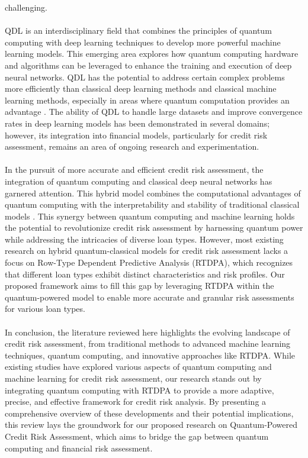 \documentclass[a4paper]{article}
\begin{document}
challenging.\\\\ QDL is an interdisciplinary field that combines the principles of quantum computing with deep learning techniques to develop more powerful machine learning models. This emerging area explores how quantum computing hardware and algorithms can be leveraged to enhance the training and execution of deep neural networks. QDL has the potential to address certain complex problems more efficiently than classical deep learning methods and classical machine learning methods, especially in areas where quantum computation provides an advantage \cite{9528698}. The ability of QDL to handle large datasets and improve convergence rates in deep learning models has been demonstrated in several domains; however, its integration into financial models, particularly for credit risk assessment, remains an area of ongoing research and experimentation.\\\\ In the pursuit of more accurate and efficient credit risk assessment, the integration of quantum computing and classical deep neural networks has garnered attention. This hybrid model combines the computational advantages of quantum computing with the interpretability and stability of traditional classical models \cite{biamonte2017quantum} \cite{havlicek2019supervised}. This synergy between quantum computing and machine learning holds the potential to revolutionize credit risk assessment by harnessing quantum power while addressing the intricacies of diverse loan types. However, most existing research on hybrid quantum-classical models for credit risk assessment lacks a focus on Row-Type Dependent Predictive Analysis (RTDPA), which recognizes that different loan types exhibit distinct characteristics and risk profiles. Our proposed framework aims to fill this gap by leveraging RTDPA within the quantum-powered model to enable more accurate and granular risk assessments for various loan types.\\\\ In conclusion, the literature reviewed here highlights the evolving landscape of credit risk assessment, from traditional methods to advanced machine learning techniques, quantum computing, and innovative approaches like RTDPA. While existing studies have explored various aspects of quantum computing and machine learning for credit risk assessment, our research stands out by integrating quantum computing with RTDPA to provide a more adaptive, precise, and effective framework for credit risk analysis. By presenting a comprehensive overview of these developments and their potential implications, this review lays the groundwork for our proposed research on Quantum-Powered Credit Risk Assessment, which aims to bridge the gap between quantum computing and financial risk assessment.
\end{document}
